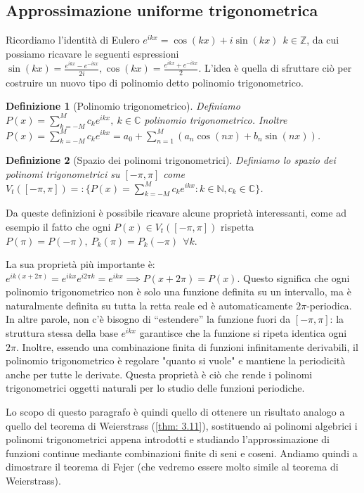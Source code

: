 \documentclass[a4paper,12pt]{report}
\newtheorem{definizione}{Definizione}[chapter]
\begin{document}
\subsection{Approssimazione uniforme trigonometrica}\label{sec: 3.3.2}

Ricordiamo l'identità di Eulero $e^{ikx}=\cos({kx})+i\sin({kx}) \ \ k \in \mathbb{Z}$, da cui possiamo ricavare le seguenti espressioni $ \sin({kx})=\displaystyle\frac{e^{ikx}-e^{-ikx}}{2i}, \cos({kx})=\frac{e^{ikx}+e^{-ikx}}{2}$. L'idea è quella di sfruttare ciò per costruire un nuovo tipo di polinomio detto polinomio trigonometrico.

\begin{definizione}[Polinomio trigonometrico]\label{def: 3.24}
    Definiamo $\displaystyle P(x)=\sum_{k=-M}^Mc_ke^{ikx},  \ k \in \mathbb{C}$ polinomio trigonometrico. Inoltre $P(x)=\displaystyle\sum_{k=-M}^Mc_ke^{ikx}=a_0+\sum_{n=1}^M(a_n\cos({nx})+b_n\sin({nx}))$.
\end{definizione}

\begin{definizione}[Spazio dei polinomi trigonometrici]
    Definiamo lo spazio dei polinomi trigonometrici su $[-\pi,\pi]$ come $V_t([-\pi,\pi])=:\bigg\{P(x)=\displaystyle\sum_{k=-M}^Mc_ke^{ikx}: k\in \mathbb{N}, c_k\in \mathbb{C}\bigg\}$.
\end{definizione}

Da queste definizioni è possibile ricavare alcune proprietà interessanti, come ad esempio il fatto che ogni $P(x)\in V_t([-\pi,\pi])$ rispetta $P(\pi)=P(-\pi), \ P_k(\pi)=P_k(-\pi) \ \ \forall k$. 

\newpage La sua proprietà più importante è: $e^{ik(x+2\pi)}=e^{ikx}e^{i2\pi k}=e^{ikx}\implies P(x+2\pi)=P(x)$. Questo significa che ogni polinomio trigonometrico non è solo una funzione definita su un intervallo, ma è naturalmente definita su tutta la retta reale ed è automaticamente $2\pi$-periodica. In altre parole, non c’è bisogno di “estendere” la funzione fuori da $[-\pi,\pi]$: la struttura stessa della base $e^{ikx}$ garantisce che la funzione si ripeta identica ogni $2\pi$. Inoltre, essendo una combinazione finita di funzioni infinitamente derivabili, il polinomio trigonometrico è regolare "quanto si vuole" e mantiene la periodicità anche per tutte le derivate. Questa proprietà è ciò che rende i polinomi trigonometrici oggetti naturali per lo studio delle funzioni periodiche.

Lo scopo di questo paragrafo è quindi quello di ottenere un risultato analogo a quello del teorema di Weierstrass (\ref{thm: 3.11}), sostituendo ai polinomi algebrici i polinomi trigonometrici appena introdotti e studiando l'approssimazione di funzioni continue mediante combinazioni finite di seni e coseni. Andiamo quindi a dimostrare il teorema di Fejer (che vedremo essere molto simile al teorema di Weierstrass).
\end{document}
